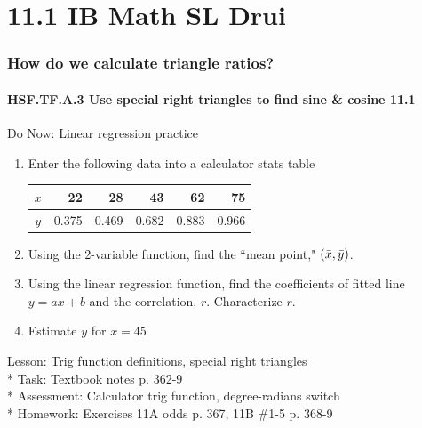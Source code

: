 \documentclass{beamer}
\begin{document}
  \section{11.1 IB Math SL Drui}
  \frame
  {
    \frametitle{How do we calculate triangle ratios?}
    \framesubtitle{HSF.TF.A.3 Use special right triangles to find sine \& cosine \qquad \alert{11.1}}

  \begin{block}{Do Now: Linear regression practice}
    \begin{enumerate}
      \item Enter the following data into a calculator stats table\\
          \begin{tabular}{|c|r|r|r|r|r|}
          \hline
          $x$ & 22 & 28 & 43 & 62 & 75\\
          \hline
          $y$ & 0.375 & 0.469 & 0.682 & 0.883 & 0.966 \\
          \hline
          \end{tabular}
      \item Using the 2-variable function, find the ``mean point," $(\Bar{x}, \Bar{y})$.
      \item Using the linear regression function, find the coefficients of fitted line $y=ax+b$ and the correlation, $r$. Characterize $r$.
      \item Estimate $y$ for $x=45$
      \end{enumerate}
    \end{block}
    Lesson: Trig function definitions, special right triangles\\*
    Task: Textbook notes p. 362-9 \\*
    Assessment: Calculator trig function, degree-radians switch\\*
    Homework: Exercises 11A odds p. 367, 11B \#1-5 p. 368-9\\
  }
\end{document}
